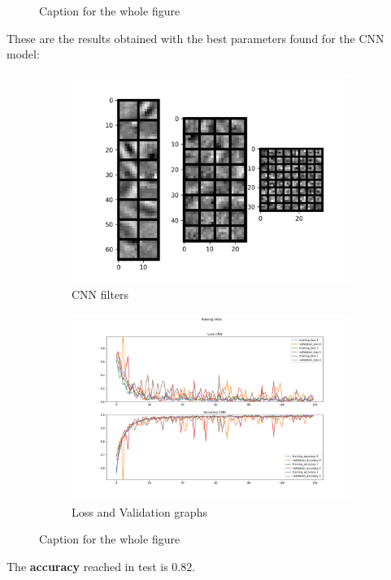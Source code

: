 \documentclass{report}
\begin{document}
\begin{figure}[t!]
  \caption{Caption for the whole figure}
  \label{fig:figure}
\end{figure}




These are the results obtained with the best parameters found for the CNN model:
\begin{figure}[t!]
  \centering
  \hspace{-2cm}
  \begin{subfigure}[t]{0.49\textwidth}
    \centering
    \includegraphics[width=1.3\textwidth]{3.CNN_500_sample/CNN_filters.png}
    \caption{CNN filters}
    \label{fig:image-set1-sub1}
  \end{subfigure}
  \hspace{-0.5cm}
  \begin{subfigure}[t]{0.49\textwidth}
    \centering
    \includegraphics[width=1.3\textwidth]{3.CNN_500_sample/training_infos.png}
    \caption{Loss and Validation graphs}
    \label{fig:image-set1-sub2}
  \end{subfigure}

  \caption{Caption for the whole figure}
  \label{fig:image-set1}
\end{figure}
The \textbf{accuracy} reached in test is $0.82$.\\
\end{document}
